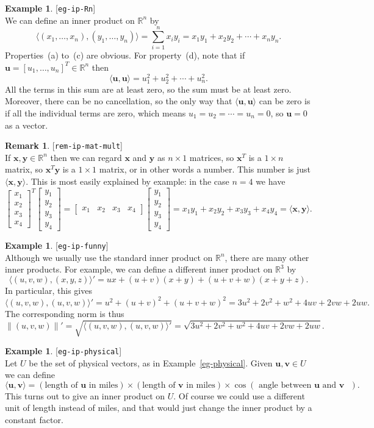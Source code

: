 \documentclass{amsart}
\newcommand{\lbl}[1]{\label{#1}\textup{[\texttt{#1}]}\ \\}
\newcommand{\lbl}{\label}
\newcommand{\R}         {{\mathbb{R}}}
\newcommand{\bsm}       {\left[\begin{smallmatrix}}
\newcommand{\esm}       {\end{smallmatrix}\right]}
\newcommand{\tm}        {\times}
\newcommand{\ip}[1]     {\langle #1\rangle}
\newcommand{\vu}        {\mathbf{u}}
\newcommand{\vv}        {\mathbf{v}}
\newcommand{\vx}        {\mathbf{x}}
\newcommand{\vy}        {\mathbf{y}}
\renewcommand{\:}       {\colon}
\theoremstyle{definition}
\newtheorem{remark}[theorem]{Remark}
\newtheorem{example}[theorem]{Example}
\begin{document}
\begin{example}\lbl{eg-ip-Rn}
 We can define an inner product on $\R^n$ by 
 \[ \ip{(x_1,\dotsc,x_n),(y_1,\dotsc,y_n)} = 
    \sum_{i=1}^n x_iy_i =
    x_1y_1 + x_2y_2 + \dotsb + x_ny_n.
 \]
 Properties~(a) to~(c) are obvious.  For property~(d), note
 that if $\vu=[u_1,\dotsc,u_n]^T\in\R^n$ then
 \[ \ip{\vu,\vu} = u_1^2 + u_2^2 + \dotsb + u_n^2. \]
 All the terms in this sum are at least zero, so the sum
 must be at least zero.  Moreover, there can be no
 cancellation, so the only way that $\ip{\vu,\vu}$ can be zero
 is if all the individual terms are zero, which means
 $u_1=u_2=\dotsb=u_n=0$, so $\vu=0$ as a vector.
\end{example}
\begin{remark}\lbl{rem-ip-mat-mult}
 If $\vx,\vy\in\R^n$ then we can regard $\vx$ and $\vy$ as
 $n\tm 1$ matrices, so $\vx^T$ is a $1\tm n$ matrix, so
 $\vx^T\vy$ is a $1\tm 1$ matrix, or in other words a
 number.  This number is just $\ip{\vx,\vy}$.  This is most
 easily explained by example: in the case $n=4$ we have
 \[ \bsm x_1\\ x_2\\ x_3\\ x_4 \esm^T
    \bsm y_1\\ y_2\\ y_3\\ y_4 \esm   =
    \bsm x_1 & x_2 & x_3 & x_4 \esm 
    \bsm y_1\\ y_2\\ y_3\\ y_4 \esm   =
    x_1y_1 + x_2y_2 + x_3y_3 + x_4y_4 = 
    \ip{\vx,\vy}.
 \]
\end{remark}
\begin{example}\lbl{eg-ip-funny}
 Although we usually use the standard inner product on
 $\R^n$, there are many other inner products.
 For example, we can define a different inner product on $\R^3$ by 
 \[ \ip{(u,v,w),(x,y,z)}' = 
     ux + (u+v)(x+y) + (u+v+w)(x+y+z).
 \]
 In particular, this gives
 \[ \ip{(u,v,w),(u,v,w)}' = 
     u^2 + (u+v)^2 + (u+v+w)^2 = 
     3u^2 + 2v^2 + w^2 + 4uv + 2vw + 2uw.
 \]
 The corresponding norm is thus
 \[ \|(u,v,w)\|' = \sqrt{\ip{(u,v,w),(u,v,w)}'} =
     \sqrt{3u^2+2v^2+w^2+4uv+2vw+2uw}.
 \]
\end{example}
\begin{example}\lbl{eg-ip-physical}
 Let $U$ be the set of physical vectors, as in
 Example~\ref{eg-physical}.  Given $\vu,\vv\in U$ we can
 define  
 \[ \ip{\vu,\vv} =
     (\text{length of $\vu$ in miles}) \tm
     (\text{length of $\vv$ in miles}) \tm
     \cos(\text{ angle between $\vu$ and $\vv$ }).
 \]
 This turns out to give an inner product on $U$.  Of course
 we could use a different unit of length instead of miles,
 and that would just change the inner product by a constant
 factor. 
\end{example}
\end{document}
